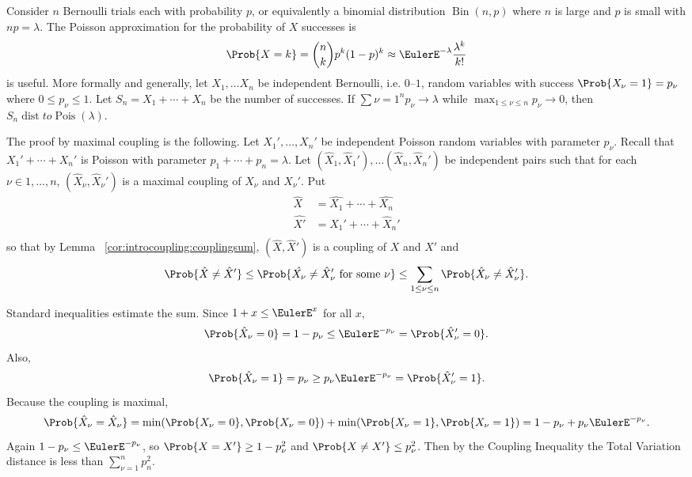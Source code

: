 \documentclass[12pt]{article}
\begin{document}
\begin{example}
    Consider \( n \) Bernoulli trials each with probability \( p \), or
    equivalently a binomial distribution \(
    \operatorname{Bin}
    (n, p) \) where \( n \) is large and \( p \) is small with \( np =
    \lambda \).  The Poisson approximation for the probability of \( X \)
    successes is
    \[
        \Prob{X = k} = \binom{n}{k} p^k (1-p)^k \approx \EulerE^{-\lambda}
        \frac{\lambda^k}{k!}
    \] is useful.  More formally and generally, let \( X_1, \dots X_n \)
    be independent Bernoulli, i.e. \( 0 \)--\( 1 \), random variables
    with success \( \Prob{X_{\nu} = 1} = p_\nu \) where \( 0 \le p_\nu
    \le 1 \).  Let \( S_n = X_1 + \cdots + X_n \) be the number of
    successes.  If \( \sum{\nu=1}^n p_{\nu} \to \lambda \) while \( \max_
    {1 \le \nu \le n} p_{\nu} \to 0 \), then \( S_{n}
    \operatorname{dist}
    to
    \operatorname{Pois}
    (\lambda) \).

    The proof by maximal coupling is the following.  Let \( X_1', \dots,
    X_n' \) be independent Poisson random variables with parameter \( p_
    {\nu} \).  Recall that \( X_1' + \cdots + X_n' \) is Poisson with
    parameter \( p_1 + \cdots + p_n = \lambda \).  Let \( (\hat{X}_1,
    \hat{X}_1'), \dots (\hat{X}_n, \hat{X}_n') \) be independent pairs
    such that for each \( \nu \in 1, \dots, n \), \( (\hat{X}_\nu, \hat{X}_\nu')
    \) is a maximal coupling of \( X_{\nu} \) and \( X_{\nu}' \).  Put
    \begin{align*}
        \hat{X} &= \hat{X_1} + \cdots + \hat{X_n} \\
        \hat{X'} &= \hat{X}_1' + \cdots + \hat{X}_n' \\
    \end{align*}
    so that by Lemma~%
    \ref{cor:introcoupling:couplingsum}, \( (\hat{X}, \hat{X}') \) is a
    coupling of \( X \) and \( X' \) and
    \[
        \Prob{\hat{X} \ne \hat{X}'} \le \Prob{\hat{X_{\nu}} \ne \hat{X}_
        {\nu}' \text{ for some } \nu} \le \sum\limits_{1 \le \nu \le n}
        \Prob{\hat{X}_{\nu} \ne \hat{X}_{\nu}'}.
    \]

    Standard inequalities estimate the sum.  Since \( 1 + x \le \EulerE^x
    \) for all \( x \),
    \[
        \Prob{\hat{X}_{\nu}=0} = 1-p_{\nu} \le \EulerE^{-p_{\nu}} =
        \Prob{\hat{X}_{\nu}'=0}.
    \] Also,
    \[
        \Prob{\hat{X}_{\nu}=1} = p_{\nu} \ge p_{\nu}\EulerE^{-p_{\nu}} =
        \Prob{\hat{X}_{\nu}'=1}.
    \] Because the coupling is maximal,
    \[
        \Prob{\hat{X}_{\nu} = \hat{X}_{\nu}} = \min( \Prob{X_{\nu}=0},
        \Prob{X_{\nu}=0}) + \min( \Prob{X_{\nu}=1}, \Prob{X_{\nu}=1}) =
        1 - p_{\nu} + p_{\nu} \EulerE^{-p_{\nu}}.
    \] Again \( 1-p_{\nu} \le \EulerE^{-p_{\nu}} \), so \( \Prob{X = X'}
    \ge 1- p_{\nu}^2 \) and \( \Prob{X \ne X'} \le p_{\nu}^2 \).  Then
    by the Coupling Inequality the Total Variation distance is less than
    \( \sum\limits_{\nu=1}^n p_n^2 \).


\end{example}
\end{document}
